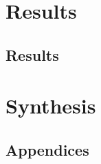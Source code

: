 \part{Results}
\chapter{Results}




\part{Synthesis}



	
\printbibliography
\clearpage



\cleardoublepage
\begin{appendices}
\chapter{Appendices}







\end{appendices}



